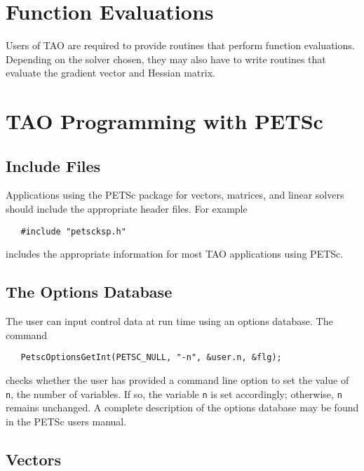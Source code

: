 \section{Function Evaluations}

Users of TAO are required to provide routines that perform function
evaluations. Depending on the solver chosen, they may also have to
write routines that evaluate the gradient vector and Hessian matrix.

\section{TAO Programming with PETSc}
\label{sec:tao_programming}

\subsection*{Include Files}

Applications using the PETSc package for vectors, matrices, and linear
solvers should include the appropriate header files.  For example
\begin{verbatim}
   #include "petscksp.h"
\end{verbatim}
\noindent
includes the appropriate information for most TAO applications using PETSc.

\subsection*{The Options Database}
\label{sec:options}

The user can input control data at run time using an options database.
The command
\begin{verbatim}
   PetscOptionsGetInt(PETSC_NULL, "-n", &user.n, &flg);
\end{verbatim}
\noindent
checks whether
the user has provided a command line option to set the value of \texttt{
n}, the number of variables.  If so, the variable \texttt{n} is set
accordingly; otherwise, \texttt{n} remains unchanged. A complete
description of the options database may be found in the PETSc users
manual.

\subsection*{Vectors}

